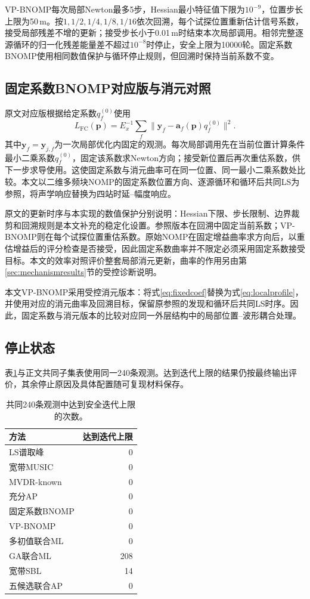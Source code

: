 \documentclass[a4paper,fleqn]{cas-sc}
\numberwithin{equation}{section}
\numberwithin{figure}{section}
\numberwithin{table}{section}
\begin{document}
VP-BNOMP每次局部Newton最多5步，Hessian最小特征值下限为$10^{-9}$，位置步长上限为50\,m。按$1,1/2,1/4,1/8,1/16$依次回溯，每个试探位置重新估计信号系数，接受局部残差不增的更新；接受步长小于0.01\,m时结束本次局部调用。相邻完整逐源循环的归一化残差能量差不超过$10^{-8}$时停止，安全上限为10000轮。固定系数BNOMP使用相同数值保护与循环停止规则，但回溯时保持当前系数不变。

\subsection{固定系数BNOMP对应版与消元对照}
原文对应版根据给定系数$q_f^{(0)}$使用
\begin{equation}
 L_{\mathrm{FC}}(\bm p)=E_x^{-1}\sum_f
 \|\bm y_f-\bm a_f(\bm p)q_f^{(0)}\|^2 .\label{eq:fixedcoef}
\end{equation}
其中$\bm y_f=\bm y_{j,f}$为一次局部优化内固定的观测。每次局部调用先在当前位置计算条件最小二乘系数$q_f^{(0)}$，固定该系数求Newton方向；接受新位置后再次重估系数，供下一步求导使用。这使固定系数与消元曲率可在同一位置、同一最小二乘系数处比较。本文以二维多频块NOMP\cite{Yang2022}的固定系数位置方向、逐源循环和循环后共同LS为参照，将声学响应替换为四站时延--幅度响应。

原文的更新时序与本实现的数值保护分别说明：Hessian下限、步长限制、边界裁剪和回溯规则是本文补充的稳定化设置。参照版本在回溯中固定当前系数；VP-BNOMP则在每个试探位置重估系数。原始NOMP在固定增益曲率求方向后，以重估增益后的评分检查是否接受\cite{Mamandipoor2016}，因此固定系数曲率并不限定必须采用固定系数接受目标。本文的效率对照评价整套局部消元更新，曲率的作用另由第\ref{sec:mechanismresults}节的受控诊断说明。

本文VP-BNOMP采用受控消元版本：将式\eqref{eq:fixedcoef}替换为式\eqref{eq:localprofile}，并使用对应的消元曲率及回溯目标，保留原参照的发现和循环后共同LS时序。因此，固定系数与消元版本的比较对应同一外层结构中的局部位置--波形耦合处理。

\subsection{停止状态}
表\ref{tab:auxiliary}与正文共同子集表使用同一240条观测。达到迭代上限的结果仍按最终输出评价，其余停止原因及具体配置随可复现材料保存。

\begin{table}[pos=H]\centering\small
\caption{共同240条观测中达到安全迭代上限的次数。}\label{tab:auxiliary}
\begin{tabular}{@{}lr@{}}\toprule
方法 & 达到迭代上限\\\midrule
LS谱取峰 & 0\\
宽带MUSIC & 0\\
MVDR-known & 0\\
充分AP & 0\\
固定系数BNOMP & 0\\
VP-BNOMP & 0\\
多初值联合ML & 0\\
GA联合ML & 208\\
宽带SBL & 14\\
五候选联合AP & 0\\
\bottomrule\end{tabular}\end{table}
\end{document}
